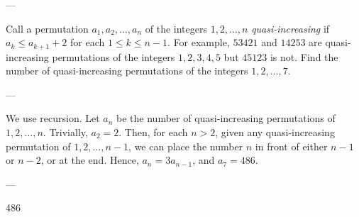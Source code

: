 
---

Call a permutation $a_1,a_2,\ldots,a_n$ of the integers $1,2,\ldots,n$ \emph{quasi-increasing} if $a_k\le a_{k+1}+2$ for each $1\le k\le n-1$. For example, $53421$ and $14253$ are quasi-increasing permutations of the integers $1,2,3,4,5$ but $45123$ is not. Find the number of quasi-increasing permutations of the integers $1,2,\ldots,7$.

---

We use recursion. Let $a_n$ be the number of quasi-increasing permutations of $1,2,\ldots,n$. Trivially, $a_2=2$. Then, for each $n>2$, given any quasi-increasing permutation of $1,2,\ldots,n-1$, we can place the number $n$ in front of either $n-1$ or $n-2$, or at the end. Hence, $a_n=3a_{n-1}$, and $a_7=486$.

---

486
